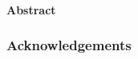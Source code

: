 \documentclass[pdflatex,a4paper,11pt,twoside]{report}
\begin{document}
  
  
  \paragraph{Abstract}
  
  \subsubsection{Acknowledgements}
  
  \setcounter{tocdepth}{5}
  \setcounter{secnumdepth}{3}  
  \tableofcontents
  
  
  
  
  
\end{document}
